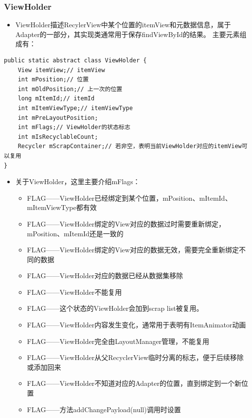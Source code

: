 \documentclass[9pt, b5paper]{article}
\begin{document}
\subsubsection{ViewHolder}
\label{sec-5-3-2}
\begin{itemize}
\item ViewHolder描述RecylerView中某个位置的itemView和元数据信息，属于Adapter的一部分，其实现类通常用于保存findViewById的结果。 主要元素组成有：
\end{itemize}
\begin{verbatim}
public static abstract class ViewHolder {
    View itemView;// itemView
    int mPosition;// 位置
    int mOldPosition;// 上一次的位置
    long mItemId;// itemId
    int mItemViewType;// itemViewType
    int mPreLayoutPosition;
    int mFlags;// ViewHolder的状态标志
    int mIsRecyclableCount;
    Recycler mScrapContainer;// 若非空，表明当前ViewHolder对应的itemView可以复用
}
\end{verbatim}
\begin{itemize}
\item 关于ViewHolder，这里主要介绍mFlags：
\begin{itemize}
\item FLAG\underBOUND——ViewHolder已经绑定到某个位置，mPosition、mItemId、mItemViewType都有效
\item FLAG\underUPDATE——ViewHolder绑定的View对应的数据过时需要重新绑定，mPosition、mItemId还是一致的
\item FLAG\underINVALID——ViewHolder绑定的View对应的数据无效，需要完全重新绑定不同的数据
\item FLAG\underREMOVED——ViewHolder对应的数据已经从数据集移除
\item FLAG\underNOT\underRECYCLABLE——ViewHolder不能复用
\item FLAG\underRETURNED\underFROM\underSCRAP——这个状态的ViewHolder会加到scrap list被复用。
\item FLAG\underCHANGED——ViewHolder内容发生变化，通常用于表明有ItemAnimator动画
\item FLAG\underIGNORE——ViewHolder完全由LayoutManager管理，不能复用
\item FLAG\underTMP\underDETACHED——ViewHolder从父RecyclerView临时分离的标志，便于后续移除或添加回来
\item FLAG\underADAPTER\underPOSITION\underUNKNOWN——ViewHolder不知道对应的Adapter的位置，直到绑定到一个新位置
\item FLAG\underADAPTER\underFULLUPDATE——方法addChangePayload(null)调用时设置
\end{itemize}
\end{itemize}
\end{document}
